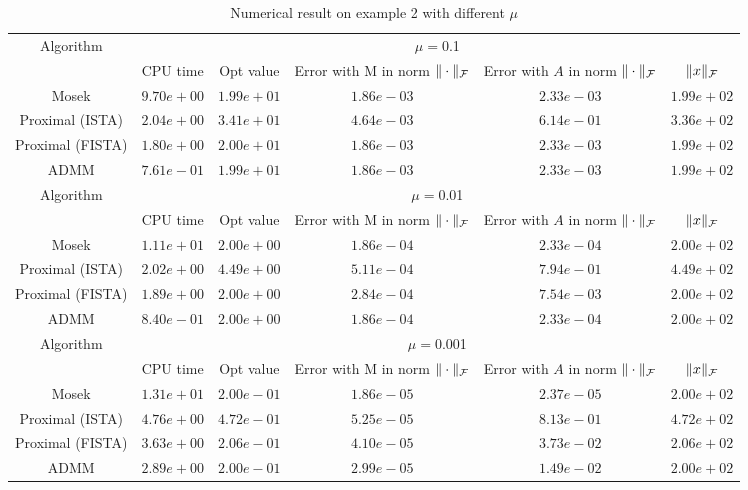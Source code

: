 \documentclass{article}
\begin{document}
   \begin{table}[H]
	\centering
	\begin{tabular}{|c|c|c|c|c|c|}
	
	\hline
	\multirow{2}{*}{ Algorithm} &\multicolumn{5}{c|}{$\mu=$0.1}\\\cline{2-6}
	 &CPU time &Opt value &Error with M in norm $\|\cdot\|_\mathcal F$ &Error with $A$ in norm $\|\cdot\|_\mathcal F$ &$\|x\|_\mathcal F$\\\hline
	Mosek & $9.70e+00$ & $1.99e+01$ & $1.86e-03$ & $2.33e-03$ & $1.99e+02$\\\hline
	Proximal (ISTA) & $2.04e+00$ & $3.41e+01$ & $4.64e-03$ & $6.14e-01$ & $3.36e+02$\\\hline
	Proximal (FISTA) & $1.80e+00$ & $2.00e+01$ & $1.86e-03$ & $2.33e-03$ & $1.99e+02$\\\hline
	ADMM & $7.61e-01$ & $1.99e+01$ & $1.86e-03$ & $2.33e-03$ & $1.99e+02$\\\hline
\multirow{2}{*}{ Algorithm} &\multicolumn{5}{c|}{$\mu=$0.01}\\\cline{2-6}
 &CPU time &Opt value &Error with M in norm $\|\cdot\|_\mathcal F$ &Error with $A$ in norm $\|\cdot\|_\mathcal F$ &$\|x\|_\mathcal F$\\\hline
Mosek & $1.11e+01$ & $2.00e+00$ & $1.86e-04$ & $2.33e-04$ & $2.00e+02$\\\hline
Proximal (ISTA) & $2.02e+00$ & $4.49e+00$ & $5.11e-04$ & $7.94e-01$ & $4.49e+02$\\\hline
Proximal (FISTA) & $1.89e+00$ & $2.00e+00$ & $2.84e-04$ & $7.54e-03$ & $2.00e+02$\\\hline
ADMM & $8.40e-01$ & $2.00e+00$ & $1.86e-04$ & $2.33e-04$ & $2.00e+02$\\\hline
\multirow{2}{*}{ Algorithm} &\multicolumn{5}{c|}{$\mu=$0.001}\\\cline{2-6}
 &CPU time &Opt value &Error with M in norm $\|\cdot\|_\mathcal F$ &Error with $A$ in norm $\|\cdot\|_\mathcal F$ &$\|x\|_\mathcal F$\\\hline
Mosek & $1.31e+01$ & $2.00e-01$ & $1.86e-05$ & $2.37e-05$ & $2.00e+02$\\\hline
Proximal (ISTA) & $4.76e+00$ & $4.72e-01$ & $5.25e-05$ & $8.13e-01$ & $4.72e+02$\\\hline
Proximal (FISTA) & $3.63e+00$ & $2.06e-01$ & $4.10e-05$ & $3.73e-02$ & $2.06e+02$\\\hline
ADMM & $2.89e+00$ & $2.00e-01$ & $2.99e-05$ & $1.49e-02$ & $2.00e+02$\\\hline
	\end{tabular}
	\caption{Numerical result on example 2 with different $\mu$\label{example2}}
	\end{table}
	
\end{document}
